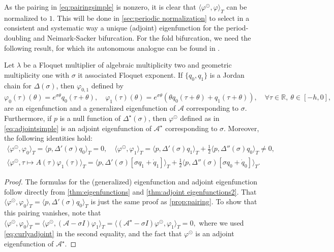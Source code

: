 \documentclass[english]{myarticle}
\begin{document}
\begin{sloppypar}
As the pairing in \eqref{eq:pairingsimple} is nonzero, it is clear that $\langle \varphi^\odot, \varphi \rangle_T$ can be normalized to $1$. This will be done in \cref{sec:periodic normalization} to select in a consistent and systematic way a unique (adjoint) eigenfunction for the period-doubling and Neimark-Sacker bifurcation. For the fold bifurcation, we need the following result, for which its autonomous analogue can be found in \cite[Lemma 2.7]{Janssens2010}.
\begin{proposition} \label{prop:pairing2}
Let $\lambda$ be a Floquet multiplier of algebraic multiplicity two and geometric multiplicity one with $\sigma$ it associated Floquet exponent. If $\{q_0,q_1\}$ is a Jordan chain for $\Delta(\sigma)$, then $\varphi_{0,1}$ defined by
\begin{equation*}
    \varphi_0(\tau)(\theta) = e^{\sigma \theta} q_0(\tau + \theta), \quad \varphi_1(\tau)(\theta) = e^{\sigma \theta} (\theta q_0(\tau + \theta) + q_1(\tau + \theta)), \quad \forall \tau \in \mathbb{R}, \ \theta \in [-h,0],
\end{equation*}
are an eigenfunction and a generalized eigenfunction of $\mathcal{A}$ corresponding to $\sigma$. Furthermore, if $p$ is a null function of $\Delta^\star(\sigma)$, then $\varphi^\odot$ defined as in \eqref{eq:adjointsimple} is an adjoint eigenfunction of $\mathcal{A}^\star$ corresponding to $\sigma$. Moreover, the following identities hold:
\begin{gather*}
    \langle \varphi^\odot,\varphi_0 \rangle_T = \langle p, \Delta'(\sigma)q_0 \rangle_T = 0, \quad \langle \varphi^\odot,\varphi_1 \rangle_T = \langle p, \Delta'(\sigma)q_1 \rangle_T + \frac{1}{2} \langle p, \Delta''(\sigma)q_0 \rangle_T \neq 0,\\
    \langle \varphi^\odot,\tau \mapsto A(\tau)\varphi_1(\tau) \rangle_T = \langle p, \Delta'(\sigma)[\sigma q_1 + \dot{q}_1]\rangle_T + \frac{1}{2} \langle p, \Delta''(\sigma)[\sigma q_0 + \dot{q}_0] \rangle_T.
\end{gather*}
\begin{proof}
The formulas for the (generalized) eigenfunction and adjoint eigenfunction follow directly from \cref{thm:eigenfunctions} and \cref{thm:adjoint eigenfunctions2}. That $\langle \varphi^\odot,\varphi_0 \rangle_T = \langle p, \Delta'(\sigma)q_0 \rangle_T$ is just the same proof as \cref{prop:pairing}. To show that this pairing vanishes, note that $\langle \varphi^\odot,\varphi_0 \rangle_T = \langle \varphi^\odot, (\mathcal{A}-\sigma I)\varphi_1 \rangle_T = \langle (\mathcal{A}^\star - \sigma I)\varphi^\odot, \varphi_1 \rangle_T = 0,$ where we used \eqref{eq:curlyadjoint} in the second equality, and the fact that $\varphi^\odot$ is an adjoint eigenfunction of $\mathcal{A}^\star$.


\end{proof}
\end{proposition}
\end{sloppypar}
\end{document}
